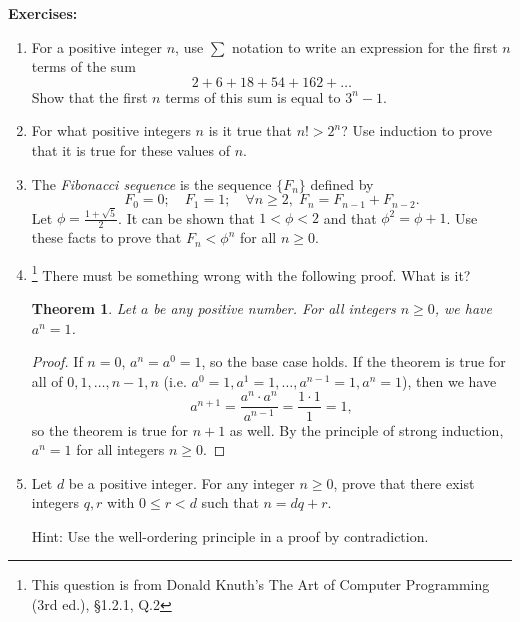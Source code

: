 \documentclass[a4paper,12pt]{article}
\newtheorem{theorem}{Theorem}
\begin{document}
\pagestyle{myheadings}


{\bf Exercises:}

\begin{enumerate}
\item
For a positive integer $n$, use $\sum$ notation to write an expression for the
first $n$ terms of the sum
\[
    2 + 6 + 18 + 54 + 162 + \dots
\]
Show that the first $n$ terms of this sum is equal to $3^n-1$.
\item
For what positive integers $n$ is it true that $n! > 2^n$? Use induction to
prove that it is true for these values of $n$.
\item
The {\em Fibonacci sequence} is the sequence $\{F_n\}$ defined by
\[
    F_0 = 0; \quad F_1 = 1; \quad \forall n \geq 2,\; F_n = F_{n-1} + F_{n-2}.
\]
Let $\phi = \frac{1 + \sqrt{5}}{2}$. It can be shown that $1 < \phi < 2$
and that $\phi^2 = \phi + 1$. Use these facts to
prove that $F_n < \phi^n$ for all $n \geq 0$.
\item
\footnote{This question is from Donald Knuth's The Art of Computer
Programming (3rd ed.), \S 1.2.1, Q.2}
There must be something wrong with the following proof. What is it?
\begin{theorem}
Let $a$ be any positive number. For all integers $n \geq 0$, we have $a^n = 1$.
\end{theorem}
\begin{proof}
If $n = 0$, $a^n = a^0 = 1$, so the base case holds.
If the theorem is true for all of $0, 1, \dots, n-1, n$ (i.e. $a^0 = 1, a^1 = 1,
\dots, a^{n-1}=1, a^n = 1$), then we have
\[
    a^{n+1} = \frac{a^n \cdot a^n}{a^{n-1}} = \frac{1 \cdot 1}{1} = 1,
\]
so the theorem is true for $n+1$ as well. By the principle of strong induction,
$a^n = 1$ for all integers $n \geq 0$.
\end{proof}
\item
Let $d$ be a positive integer. For any integer $n \geq 0$, prove that there
exist integers $q, r$ with $0 \leq r < d$ such that $n = dq+r$.

Hint: Use the well-ordering principle in a proof by contradiction.


\end{enumerate}
\end{document}
